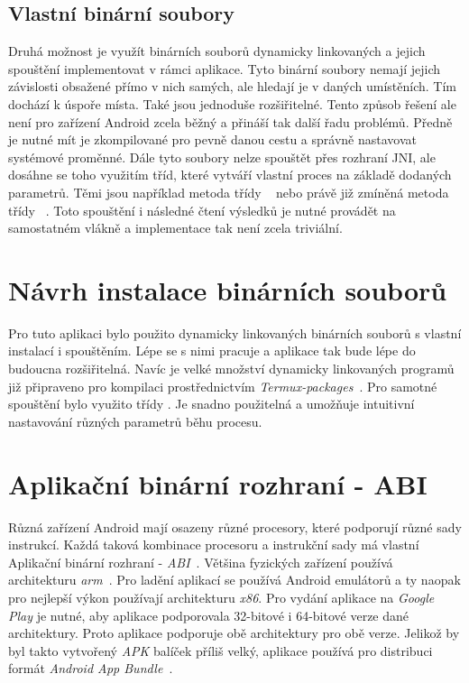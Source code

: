     \subsection{Vlastní binární soubory}\label{subsec:dyn_binaries}
    Druhá možnost je využít binárních souborů dynamicky linkovaných a jejich spouštění implementovat v rámci aplikace. Tyto binární soubory nemají jejich závislosti obsažené přímo v nich samých, ale hledají je v daných umístěních. Tím dochází k úspoře místa. Také jsou jednoduše rozšiřitelné. Tento způsob řešení ale není pro zařízení Android zcela běžný a přináší tak další řadu problémů. Předně je nutné mít je zkompilované pro pevně danou cestu a správně nastavovat systémové proměnné. Dále tyto soubory nelze spouštět přes rozhraní JNI, ale dosáhne se toho využitím tříd, které vytváří vlastní proces na základě dodaných parametrů. Těmi jsou například metoda  třídy ~ nebo právě již zmíněná metoda  třídy ~. Toto spouštění i následné čtení výsledků je nutné provádět na samostatném vlákně a implementace tak není zcela triviální.

\section{Návrh instalace binárních souborů}
Pro tuto aplikaci bylo použito dynamicky linkovaných binárních souborů s vlastní instalací i spouštěním. Lépe se s nimi pracuje a aplikace tak bude lépe do budoucna rozšiřitelná. Navíc je velké množství dynamicky linkovaných programů již připraveno pro kompilaci prostřednictvím \emph{Termux-packages}~. Pro samotné spouštění bylo využito třídy . Je snadno použitelná a umožňuje intuitivní nastavování různých parametrů běhu procesu.

\section{Aplikační binární rozhraní - ABI}
Různá zařízení Android mají osazeny různé procesory, které podporují různé sady instrukcí. Každá taková kombinace procesoru a instrukční sady má vlastní Aplikační binární rozhraní - \emph{ABI}~. Většina fyzických zařízení používá architekturu \emph{arm}~. Pro ladění aplikací se používá Android emulátorů a ty naopak pro nejlepší výkon používají architekturu \emph{x86}. Pro vydání aplikace na \emph{Google Play} je nutné, aby aplikace podporovala 32-bitové i 64-bitové verze dané architektury. Proto aplikace podporuje obě architektury pro obě verze. Jelikož by byl takto vytvořený \emph{APK} balíček příliš velký, aplikace používá pro distribuci formát \emph{Android App Bundle}~.
    

